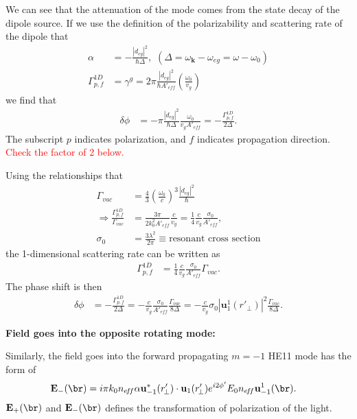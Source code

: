 \documentclass[]{report}
\begin{document}
We can see that the attenuation of the mode comes from the state decay of the dipole source. If we use the definition of the polarizability and scattering rate of the dipole that 
\begin{align}
\alpha &=-\frac{|d_{eg}|^2}{\hbar \Delta}, \,\, (\Delta=\omega_{\mathbf{k}}-\omega_{eg}=\omega-\omega_0)\\
\Gamma^{1D}_{p,f} &= \gamma^g=2\pi \frac{|d_{eg}|^2}{\hbar A'_{e\!f\!f}}\left(\frac{\omega_0}{v_g} \right)
\end{align}
we find that 
\begin{align}\label{phaseshiftGamma1D}
\delta\phi &= -\pi \frac{|d_{eg}|^2}{\hbar \Delta} \frac{\omega_0}{v_gA'_{e\!f\!f}}=-\frac{\Gamma^{1\!D}_{p,f}}{2\Delta}.
\end{align}
The subscript $ p $ indicates polarization, and $ f $ indicates propagation direction. \textcolor{red}{Check the factor of 2 below.}


Using the relationships that 
\begin{align}
\Gamma_{vac} &= \frac{4}{3} \left( \frac{\omega_0}{c}\right)^3 \frac{|d_{eg}|^2}{\hbar}\\
\Rightarrow \frac{\Gamma^{1\!D}_{p,f}}{\Gamma_{vac}} &= \frac{3\pi}{2k_0^2A'_{e\!f\!f}} \frac{c}{v_g} = \frac{1}{4} \frac{c}{v_g} \frac{\sigma_0}{A'_{e\!f\!f}},\\
\sigma_0 &= \frac{3\lambda^2}{2\pi} \equiv \text{resonant cross section}
\end{align}
the 1-dimensional scattering rate can be written as 
\begin{align}\label{Gamma1DGammavac}
\Gamma^{1\!D}_{p,f} &= \frac{1}{4} \frac{c}{v_g} \frac{\sigma_0}{A'_{e\!f\!f}}\Gamma_{vac}.
\end{align}
The phase shift is then
\begin{align}
\delta\phi &= -\frac{\Gamma^{1\!D}_{p,f}}{2\Delta} = -\frac{c}{v_g} \frac{\sigma_0 }{A'_{e\!f\!f}} \frac{\Gamma_{vac}}{8\Delta} = -\frac{c}{v_g} \sigma_0 |\mathbf{u}_1^1 (r'_{\!\perp})|^2 \frac{\Gamma_{vac}}{8\Delta}.
\end{align}

\bigskip
\textbf{Field goes into the opposite rotating mode:}

Similarly, the field goes into the forward propagating $ m=-1 $ HE11 mode has the form of 
\begin{align}
\mathbf{E}_{-}(\br) &=  i\pi k_0 n_{e\!f\!f}\alpha  \mathbf{u}^*_{-1}(r'_{\!\perp})\cdot \mathbf{u}_1(r'_{\!\perp})e^{i2\phi'}E_0n_{e\!f\!f}\mathbf{u}_{-1}^1(\br).
\end{align}
$ \mathbf{E}_{+}(\br) $ and $\mathbf{E}_{-}(\br)$ defines the transformation of polarization of the light. 
\end{document}
